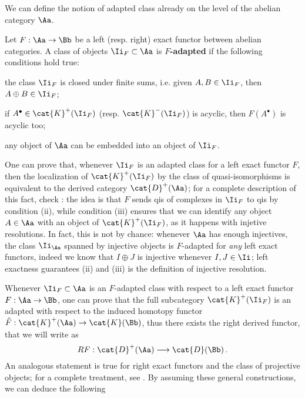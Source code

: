 We can define the notion of adapted class already
on the level of the abelian category $\Aa$.

\begin{df}
    Let $F:\Aa \to \Bb$ be a left (resp. right) exact functor between abelian categories.
    A class of objects $\Ii_{F} \subset \Aa$ is \textbf{$F$-adapted}
    if the following conditions hold true:
    \begin{rmnumerate}
        \item the class $\Ii_{F}$ is closed under finite sums, 
        i.e. given $A, B \in \Ii_{F}$, then $A \oplus B \in \Ii_{F}$;
        \item if $A^{\bullet} \in \cat{K}^{+}(\Ii_{F})$ 
        (resp. $\cat{K}^{-}(\Ii_{F})$) is acyclic,
        then $F(A^{\bullet})$ is acyclic too;
        \item any object of $\Aa$ can be embedded into an
        object of $\Ii_{F}$.
    \end{rmnumerate}
\end{df}

One can prove that, whenever $\Ii_{F}$ is an adapted class for a
left exact functor $F$, then the localization 
of $\cat{K}^{+}(\Ii_{F})$ by the class of quasi-isomorphisms
is equivalent to the derived category $\cat{D}^{+}(\Aa)$;
for a complete description of this fact, 
check \parencite[Proposition~III.6.4]{gelfand}:
the idea is that $F$ sends qis of complexes in $\Ii_{F}$
to qis by condition (ii), while condition (iii) ensures
that we can identify any object $A \in \Aa$ with an
object of $\cat{K}^{+}(\Ii_{F})$, as it happens
with injetive resolutions.
In fact, this is not by chance: whenever $\Aa$ has enough
injectives, the class $\Ii_{\Aa}$ spanned by injective objects
is $F$-adapted for \emph{any} left exact functors, indeed
we know that $I \oplus J$ is injective whenever $I, J \in \Ii$;
left exactness guarantees (ii) and (iii) is the definition of
injective resolution.

Whenever $\Ii_{F} \subset \Aa$ is an $F$-adapted class 
with respect to a left exact functor $F:\Aa \to \Bb$,
one can prove that the full subcategory
$\cat{K}^{+}(\Ii_{F})$ is an adapted
with respect to the induced homotopy functor
$\Tilde{F}:\cat{K}^{+}(\Aa) \to \cat{K}(\Bb)$,
thus there exists the right derived functor,
that we will write as
\begin{equation*}
    RF : \cat{D}^{+}(\Aa) \longrightarrow \cat{D}(\Bb)\,.
\end{equation*}
An analogous statement is true for 
right exact functors and the class of projective objects;
for a complete treatment, see \parencite[Theorem~III.6.8]{gelfand}.
By assuming these general constructions,
we can deduce the following

